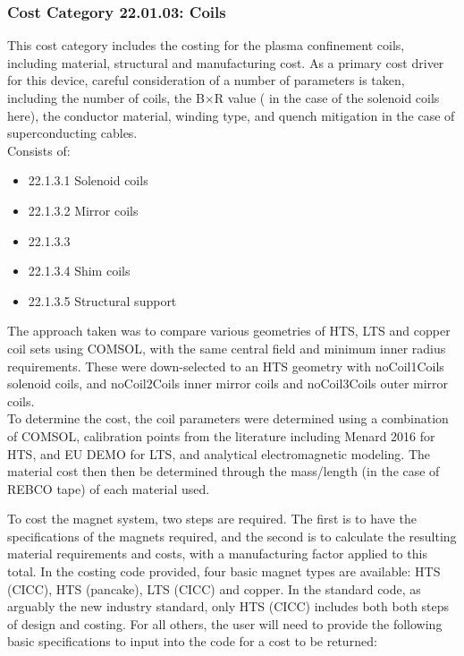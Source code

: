\subsubsection*{Cost Category 22.01.03: Coils}

This cost category includes the costing for the plasma confinement coils, including  material, structural and manufacturing cost. As a primary cost driver for this device, careful consideration of a number of parameters is taken, including the number of coils, the B$\times$R value ( in the case of the solenoid coils here), the conductor material, winding type, and quench mitigation in the case of superconducting cables.\\

Consists of:

\begin{itemize}
    \item 22.1.3.1 Solenoid coils
    \item 22.1.3.2 Mirror coils
    \item 22.1.3.3
    \item 22.1.3.4 Shim coils
    \item 22.1.3.5 Structural support
\end{itemize}
   

The approach taken was to compare various geometries of HTS, LTS and copper coil sets using COMSOL, with the same central field and minimum inner radius requirements. These were down-selected to an HTS geometry with noCoil1Coils solenoid coils, and noCoil2Coils inner mirror coils and noCoil3Coils outer mirror coils.\\

To determine the cost, the coil parameters were determined using a combination of COMSOL, calibration points from the literature including Menard 2016 \cite{Menard2016} for HTS, and EU DEMO for LTS, and analytical electromagnetic modeling. The material cost then then be determined through the mass/length (in the case of REBCO tape) of each material used. 

To cost the magnet system, two steps are required. The first is to have the specifications of the magnets required, and the second is to calculate the resulting material requirements and costs, with a manufacturing factor applied to this total. In the costing code provided, four basic magnet types are available: HTS (CICC), HTS (pancake), LTS (CICC) and copper. In the standard code, as arguably the new industry standard, only HTS (CICC) includes both both steps of design and costing. For all others, the user will need to provide the following basic specifications to input into the code for a cost to be returned:

